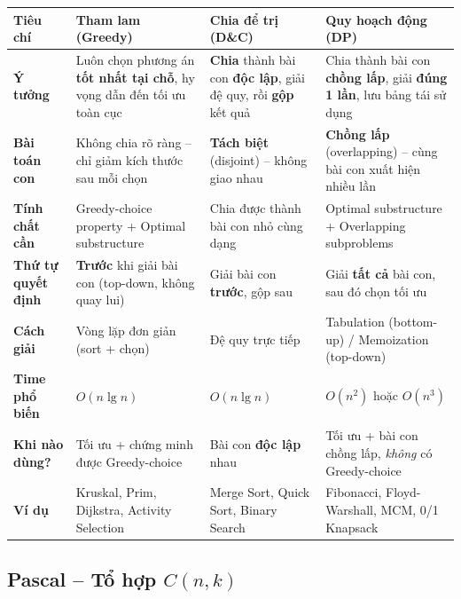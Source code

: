 \documentclass[10pt]{article}
\begin{document}
\begin{center}
{\small
\begin{longtable}{|>{\raggedright\arraybackslash}p{2.2cm}|>{\raggedright\arraybackslash}p{3.8cm}|>{\raggedright\arraybackslash}p{3.8cm}|>{\raggedright\arraybackslash}p{3.8cm}|}
\hline
\textbf{Tiêu chí} & \textbf{Tham lam (Greedy)} & \textbf{Chia để trị (D\&C)} & \textbf{Quy hoạch động (DP)} \\
\hline\hline
\textbf{Ý tưởng} & Luôn chọn phương án \textbf{tốt nhất tại chỗ}, hy vọng dẫn đến tối ưu toàn cục & \textbf{Chia} thành bài con \textbf{độc lập}, giải đệ quy, rồi \textbf{gộp} kết quả & Chia thành bài con \textbf{chồng lấp}, giải \textbf{đúng 1 lần}, lưu bảng tái sử dụng \\
\hline
\textbf{Bài toán con} & Không chia rõ ràng -- chỉ giảm kích thước sau mỗi chọn & \textbf{Tách biệt} (disjoint) -- không giao nhau & \textbf{Chồng lấp} (overlapping) -- cùng bài con xuất hiện nhiều lần \\
\hline
\textbf{Tính chất cần} & Greedy-choice property + Optimal substructure & Chia được thành bài con nhỏ cùng dạng & Optimal substructure + Overlapping subproblems \\
\hline
\textbf{Thứ tự quyết định} & \textbf{Trước} khi giải bài con (top-down, không quay lui) & Giải bài con \textbf{trước}, gộp sau & Giải \textbf{tất cả} bài con, sau đó chọn tối ưu \\
\hline
\textbf{Cách giải} & Vòng lặp đơn giản (sort + chọn) & Đệ quy trực tiếp & Tabulation (bottom-up) / Memoization (top-down) \\
\hline
\textbf{Time phổ biến} & $O(n \lg n)$ & $O(n \lg n)$ & $O(n^2)$ hoặc $O(n^3)$ \\
\hline
\textbf{Khi nào dùng?} & Tối ưu + chứng minh được Greedy-choice & Bài con \textbf{độc lập} nhau & Tối ưu + bài con chồng lấp, \textit{không} có Greedy-choice \\
\hline
\textbf{Ví dụ} & Kruskal, Prim, Dijkstra, Activity Selection & Merge Sort, Quick Sort, Binary Search & Fibonacci, Floyd-Warshall, MCM, 0/1 Knapsack \\
\hline
\end{longtable}
}
\label{tab:greedy-dc-dp}
\end{center}

\subsection{\texorpdfstring{Pascal -- Tổ hợp
\(C(n,k)\)}{Pascal -- Tổ hợp C(n,k)}}\label{pascal-tux1ed5-hux1ee3p-cnk}
\end{document}
